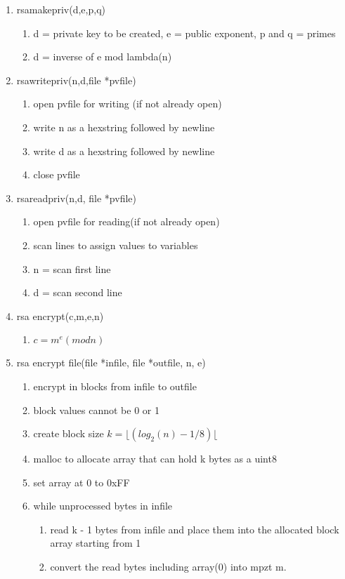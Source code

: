 \documentclass[11pt]{article}
\begin{document}
\begin{enumerate}
\item rsamakepriv(d,e,p,q)
	\begin{enumerate}
	\item d = private key to be created, e = public exponent, p and q = primes
	\item d = inverse of e mod lambda(n)
	\end{enumerate}
\item rsawritepriv(n,d,file *pvfile)
	\begin{enumerate}
	\item open pvfile for writing (if not already open)
	\item write n as a hexstring followed by newline
	\item write d as a hexstring followed by newline
	\item close pvfile
	\end{enumerate}
\item rsareadpriv(n,d, file *pvfile)
	\begin{enumerate}
	\item open pvfile for reading(if not already open)
	\item scan lines to assign values to variables
	\item n = scan first line
	\item d = scan second line
	\end{enumerate}
\item rsa encrypt(c,m,e,n)
	\begin{enumerate}
	\item \(c = m^e (mod n)\)
	\end{enumerate}
\item rsa encrypt file(file *infile, file *outfile, n, e)
	\begin{enumerate}
	\item encrypt in blocks from infile to outfile
	\item block values cannot be 0 or 1
	\item create block size \(k = \lfloor (log_2 (n) -1 / 8) \lfloor\)
	\item malloc to allocate array that can hold k bytes as a uint8
	\item set array at 0 to 0xFF
	\item while unprocessed bytes in infile
		\begin{enumerate}
		\item read k - 1 bytes from infile and place them into the allocated block array starting from 1
		\item convert the read bytes including array(0) into mpzt m.

\end{enumerate}
\end{enumerate}
\end{enumerate}
\end{document}
